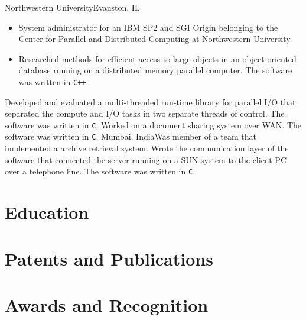 {Northwestern University}{Evanston, IL}
{\begin{itemize}
	\item System administrator for an IBM SP2 and SGI Origin belonging to the 
		Center for Parallel and Distributed Computing at Northwestern University.
	\item Researched methods for efficient access to large objects in an object-oriented
		database running on a distributed memory parallel computer. The
		software was written in \texttt{C++}.
	\end{itemize}}
{Developed and evaluated a multi-threaded run-time library for parallel I/O that
separated the compute and I/O tasks in two separate threads of control. The
software was written in \texttt{C}.}
{Worked on a document sharing system over WAN. The software was written in \texttt{C}.}
{Mumbai, India}{}{Was member of a team that implemented a archive retrieval system.
Wrote the communication layer of the software that connected the server running
on a SUN system to the client PC over a telephone line. The software was
written in \texttt{C}.}

\section{Education}   
\section{Patents and Publications}
\section{Awards and Recognition}
